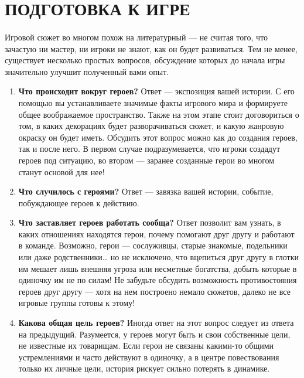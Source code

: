 \section{ПОДГОТОВКА К ИГРЕ}
\paragraph{}
Игровой сюжет во многом похож на литературный — не считая того, что зачастую ни мастер, ни игроки не знают, как он будет развиваться. Тем не менее, существует несколько простых вопросов, обсуждение которых до начала игры значительно улучшит полученный вами опыт.
\begin{enumerate}
\item \textbf{Что происходит вокруг героев?}
\newline
Ответ — экспозиция вашей истории. С его помощью вы устанавливаете значимые факты игрового мира и формируете общее воображаемое пространство. Также на этом этапе стоит договориться о том, в каких декорациях будет разворачиваться сюжет, и какую жанровую окраску он будет иметь. Обсудить этот вопрос можно как до создания героев, так и после него. В первом случае подразумевается, что игроки создадут героев под ситуацию, во втором — заранее созданные герои во многом станут основой для нее!
\item \textbf{Что случилось с героями?}
\newline
Ответ — завязка вашей истории, событие, побуждающее героев к действию.
\item \textbf{Что заставляет героев работать сообща?}
\newline
Ответ позволит вам узнать, в каких отношениях находятся герои, почему помогают друг другу и работают в команде. Возможно, герои — сослуживцы, старые знакомые, подельники или даже родственники… но не исключено, что вцепиться друг другу в глотки им мешает лишь внешняя угроза или несметные богатства, добыть которые в одиночку им не по силам! Не забудьте обсудить возможность противостояния героев друг другу — хотя на нем построено немало сюжетов, далеко не все игровые группы готовы к этому!
\item \textbf{Какова общая цель героев?}
\newline
Иногда ответ на этот вопрос следует из ответа на предыдущий. Разумеется, у героев могут быть и свои собственные цели, не известные их товарищам. Если герои не связаны какими-то общими устремлениями и часто действуют в одиночку, а в центре повествования только их личные цели, история рискует сильно потерять в динамике. 
\end{enumerate}
